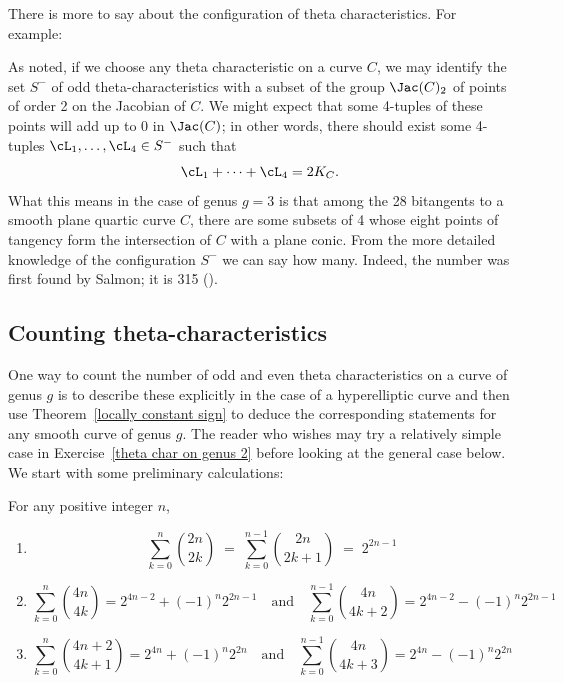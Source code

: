 There is more to say about the configuration of theta characteristics. For example:
\begin{fact}
 As noted, if we choose any theta characteristic on a curve $C$, we may identify the set $S^-$ of odd theta-characteristics with a subset of the group $\Jac(C)_2$ of points of order 2 on the Jacobian of $C$. We might expect that some 4-tuples of these points will add up to 0 in $\Jac(C)$; in other words, there should exist some 4-tuples $\cL_1,\dots,\cL_4 \in S^-$ such that
$$
\cL_1+ \dots +\cL_4 = 2K_C.
$$
What this means in the case of genus $g=3$ is that among the 28 bitangents to a smooth plane quartic curve $C$, there are some subsets of 4 whose eight points of tangency form the intersection of $C$ with a plane conic. From the more detailed knowledge of the configuration $S^-$ we can say how many. Indeed, the number was first found by Salmon; it is 315 (\cite{MR0115124}).
\end{fact}

\subsection{Counting theta-characteristics}\label{theta characteristic count}

One way to count the number of odd and even theta characteristics on a curve of genus $g$ is  to describe these explicitly in the case of a hyperelliptic curve and then use Theorem~\ref{locally constant sign} to deduce the corresponding statements for any smooth curve of genus $g$. 
The reader who wishes may  try a relatively simple case in Exercise~\ref{theta char on genus 2} before looking at the general case below.
We start with some preliminary calculations:

\begin{lemma}\label{summing binomials}
For any positive integer $n$,
\begin{enumerate}
\item 
$$
\sum_{k=0}^n \binom{2n}{2k} \; = \; \sum_{k=0}^{n-1} \binom{2n}{2k+1} \; = \; 2^{2n-1}
$$
\item 
$$
\sum_{k=0}^n \binom{4n}{4k} = 2^{4n-2}  + (-1)^n 2^{2n-1} \quad \text{and} \quad \sum_{k=0}^{n-1} \binom{4n}{4k+2} = 2^{4n-2} - (-1)^n  2^{2n-1}
$$
\item 
$$
\sum_{k=0}^n \binom{4n+2}{4k+1} = 2^{4n} + (-1)^n 2^{2n} \quad \text{and} \quad \sum_{k=0}^{n-1} \binom{4n}{4k+3} = 2^{4n} - (-1)^n  2^{2n}
$$
\end{enumerate}
\end{lemma}

